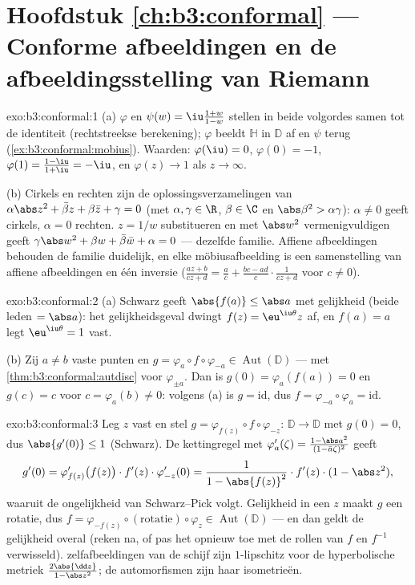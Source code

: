 \section*{Hoofdstuk \ref{ch:b3:conformal} --- Conforme
afbeeldingen en de afbeeldingsstelling van Riemann}

\begin{solution}{exo:b3:conformal:1}
(a) $\varphi$ en $\psi(w) = \iu\frac{1+w}{1-w}$ stellen in beide
volgordes samen tot de identiteit (rechtstreekse berekening);
$\varphi$ beeldt $\mathbb H$ in $\mathbb D$ af en $\psi$ terug
(\cref{ex:b3:conformal:mobius}). Waarden: $\varphi(\iu) = 0$,
$\varphi(0) = -1$, $\varphi(1) = \frac{1 - \iu}{1 + \iu} = -\iu$,
en $\varphi(z) \to 1$ als $z \to \infty$.

(b) Cirkels en rechten zijn de oplossingsverzamelingen van
$\alpha\abs z^2 + \bar\beta z + \beta\bar z + \gamma = 0$ (met
$\alpha, \gamma \in \R$, $\beta \in \C$ en $\abs\beta^2 >
\alpha\gamma$): $\alpha \neq 0$ geeft cirkels, $\alpha = 0$
rechten. $z = 1/w$ substitueren en met $\abs w^2$
vermenigvuldigen geeft $\gamma\abs w^2 + \beta w + \bar\beta\bar
w + \alpha = 0$ --- dezelfde familie. Affiene afbeeldingen
behouden de familie duidelijk, en elke möbiusafbeelding is een
samenstelling van affiene afbeeldingen en één inversie
($\frac{az+b}{cz+d} = \frac ac + \frac{bc - ad}{c}\cdot\frac1{cz
+ d}$ voor $c \neq 0$).
\end{solution}

\begin{solution}{exo:b3:conformal:2}
(a) Schwarz geeft $\abs{f(a)} \leq \abs a$ met gelijkheid (beide
leden $= \abs a$): het gelijkheidsgeval dwingt $f(z) =
\eu^{\iu\theta}z$ af, en $f(a) = a$ legt $\eu^{\iu\theta} = 1$
vast.

(b) Zij $a \neq b$ vaste punten en $g = \varphi_a\circ
f\circ\varphi_{-a} \in \operatorname{Aut}(\mathbb D)$ --- met
\cref{thm:b3:conformal:autdisc} voor $\varphi_{\pm a}$. Dan is
$g(0) = \varphi_a(f(a)) = 0$ en $g(c) = c$ voor $c =
\varphi_a(b) \neq 0$: volgens (a) is $g = \mathrm{id}$, dus $f =
\varphi_{-a}\circ\varphi_a = \mathrm{id}$.
\end{solution}

\begin{solution}{exo:b3:conformal:3}
Leg $z$ vast en stel $g = \varphi_{f(z)}\circ f\circ\varphi_{-z}$:
 $\mathbb D \to \mathbb D$ met $g(0) = 0$, dus
$\abs{g'(0)} \leq 1$ (Schwarz). De kettingregel met
$\varphi_a'(\zeta) = \frac{1 - \abs a^2}{(1 - \bar a\zeta)^2}$
geeft
\[
g'(0) = \varphi_{f(z)}'\bigl(f(z)\bigr)\cdot f'(z)\cdot
\varphi_{-z}'(0)
= \frac{1}{1 - \abs{f(z)}^2}\cdot f'(z)\cdot(1 - \abs z^2),
\]
waaruit de ongelijkheid van Schwarz--Pick volgt. Gelijkheid in
een $z$ maakt $g$ een rotatie, dus $f =
\varphi_{-f(z)}\circ(\text{rotatie})\circ\varphi_z \in
\operatorname{Aut}(\mathbb D)$ --- en dan geldt de gelijkheid
overal (reken na, of pas het opnieuw toe met de rollen van $f$ en
$f^{-1}$ verwisseld).  zelfafbeeldingen van de schijf
zijn $1$-lipschitz voor de hyperbolische metriek $\frac{2\abs{\dd
z}}{1 - \abs z^2}$; de automorfismen zijn haar isometrieën.
\end{solution}

